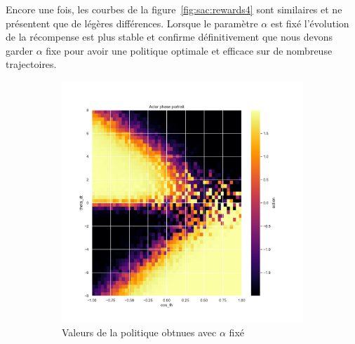 Encore une fois, les courbes de la figure~\ref{fig:sac:rewards4} sont similaires et ne présentent que de légères différences. Lorsque le paramètre \(\alpha\) est fixé l'évolution de la récompense est plus stable et confirme définitivement que nous devons garder \(\alpha\) fixe pour avoir une politique optimale et efficace sur de nombreuse trajectoires.

\begin{figure}[H]
    \centering
    \begin{subfigure}{0.45\textwidth}
        \includegraphics[width=\textwidth]{figures/sac_itr4/a_fixed/5_actor_pg__post_Pendulum-v0.pdf}
        \caption{Valeurs de la politique obtnues avec \(\alpha\) fixé}
    \end{subfigure}
    \begin{subfigure}{0.45\textwidth}

\end{subfigure}
\end{figure}
